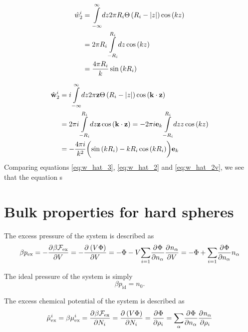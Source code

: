\documentclass[12pt, letterpaper]{article}
\newcommand*{\pd}[3][]{\frac{\partial^{#1}#2}{\partial{#3}^{#1}}}%
\newcommand*{\abs}[1]{\lvert#1\rvert}
\newcommand*{\lb}{\ensuremath{\left(}}
\newcommand*{\rb}{\ensuremath{\right)}}
\newcommand{\excess}{\ensuremath{\text{ex}}\xspace}
\newcommand{\ideal}{\ensuremath{\text{id}}\xspace}
\begin{document}
\begin{align}
  \hat{w}_2^i &=  \overset{\infty}{\underset{-\infty}{\int}} dz 2 \pi R_i \Theta \lb R_i - \abs{z} \rb \cos \lb k z \rb \nonumber \\
              &=  2 \pi R_i \overset{R_i}{\underset{-R_i}{\int}} dz  \cos \lb k z \rb  \nonumber \\
              &=  \frac{4 \pi R_i}{k} \sin \lb k R_i \rb \label{eq:w_hat_2}
\end{align}

\begin{align}
  \hat{\mathbf{w}}_2^i &=  i \overset{\infty}{\underset{-\infty}{\int}} dz 2 \pi \mathbf{z}  \Theta \lb R_i - \abs{z} \rb \cos \lb \mathbf{k} \cdot \mathbf{z} \rb \nonumber \\
                       &=  2 \pi i  \overset{R_i}{\underset{-R_i}{\int}} dz \mathbf{z}  \cos \lb \mathbf{k} \cdot \mathbf{z} \rb =  - 2 \pi i \mathbf{e}_k  \overset{R_i}{\underset{-R_i}{\int}} dz z  \cos \lb k z \rb \nonumber \\
                       &=  -\frac{4 \pi i}{k^2} \biggl( \sin \lb k R_i \rb - k R_i \cos \lb k R_i \rb \biggr) \mathbf{e}_k \label{eq:w_hat_2v}
\end{align}
Comparing equations \eqref{eq:w_hat_3}, \eqref{eq:w_hat_2} and \eqref{eq:w_hat_2v}, we see that the equation s


\section{Bulk properties for hard spheres}

The excess pressure of the system is described as
\begin{equation}
  \label{eq:pressure}
  \beta p_{\excess} = -\pd{\beta \mathcal{F_{\excess}}}{V} = -\pd{\lb V \Phi \rb}{V} = -\Phi - V\underset{i=1}{\sum} \pd{\Phi}{n_{\alpha}}\pd{n_{\alpha}}{V} = -\Phi + \underset{i=1}{\sum} \pd{\Phi}{n_{\alpha}}n_{\alpha}
\end{equation}

The ideal pressure of the system is simply
\begin{equation}
  \beta p_{\ideal} = n_{0}.
\end{equation}

The excess chemical potential of the system is described as
\begin{equation}
  \label{eq:chem_pot}
  \hat{\mu}^i_{\excess} = \beta \mu^i_{\excess} = \pd{\beta \mathcal{F_{\excess}}}{N_i} = \pd{\lb V \Phi \rb}{N_i} = \pd{\Phi}{\rho_{i}} = \underset{\alpha}{\sum} \pd{\Phi}{n_{\alpha}}\pd{n_{\alpha}}{\rho_{i}}
\end{equation}
\end{document}
